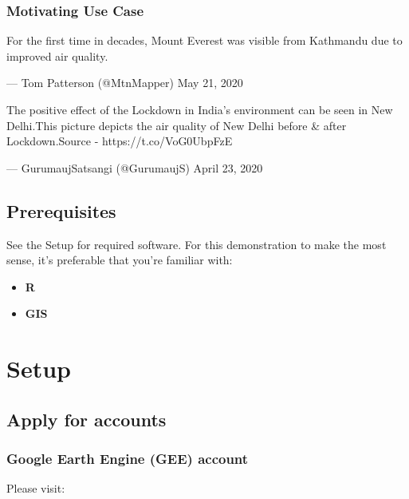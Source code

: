 \documentclass[]{book}
\providecommand{\tightlist}{%
  \setlength{\itemsep}{0pt}\setlength{\parskip}{0pt}}
\begin{document}
\hypertarget{motivating-use-case}{%
\subsection*{Motivating Use Case}\label{motivating-use-case}}

For the first time in decades, Mount Everest was visible from Kathmandu due to improved air quality.

--- Tom Patterson (@MtnMapper) May 21, 2020

The positive effect of the Lockdown in India's environment can be seen in New Delhi.This picture depicts the air quality of New Delhi before \& after Lockdown.Source - https://t.co/VoG0UbpFzE

--- GurumaujSatsangi (@GurumaujS) April 23, 2020

\hypertarget{prerequisites}{%
\section*{Prerequisites}\label{prerequisites}}

See the Setup for required software. For this demonstration to make the most sense, it's preferable that you're familiar with:

\begin{itemize}
\tightlist
\item
  \textbf{R}
\item
  \textbf{GIS}
\end{itemize}

\hypertarget{setup}{%
\chapter*{Setup}\label{setup}}

\hypertarget{apply-for-accounts}{%
\section{Apply for accounts}\label{apply-for-accounts}}

\hypertarget{google-earth-engine-gee-account}{%
\subsection{Google Earth Engine (GEE) account}\label{google-earth-engine-gee-account}}

Please visit:
\end{document}

